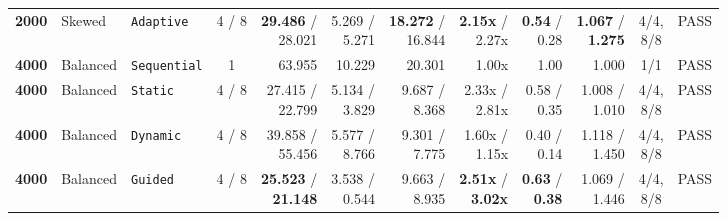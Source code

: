 \documentclass[11pt,a4paper]{article}
\renewcommand{\_}{\textunderscore\allowbreak}
\begin{document}
\begin{table}[H]
{\begin{tabular}{r l l c r r r r r r c c}
\textbf{2000} & Skewed & \texttt{Adaptive} & 4 / 8 & \makecell[r]{\textbf{29.486} /\\ 28.021} & \makecell[r]{5.269 /\\ 5.271} & \makecell[r]{\textbf{18.272} /\\ 16.844} & \makecell[r]{\textbf{2.15x} /\\ 2.27x} & \makecell[r]{\textbf{0.54} /\\ 0.28} & \makecell[r]{\textbf{1.067} /\\ \textbf{1.275}} & \makecell[c]{4/4,\\ 8/8} & PASS \\
\textbf{4000} & Balanced & \texttt{Sequential} & 1 & 63.955 & 10.229 & 20.301 & 1.00x & 1.00 & 1.000 & 1/1 & PASS \\
\textbf{4000} & Balanced & \texttt{Static} & 4 / 8 & \makecell[r]{27.415 /\\ 22.799} & \makecell[r]{5.134 /\\ 3.829} & \makecell[r]{9.687 /\\ 8.368} & \makecell[r]{2.33x /\\ 2.81x} & \makecell[r]{0.58 /\\ 0.35} & \makecell[r]{1.008 /\\ 1.010} & \makecell[c]{4/4,\\ 8/8} & PASS \\
\textbf{4000} & Balanced & \texttt{Dynamic} & 4 / 8 & \makecell[r]{39.858 /\\ 55.456} & \makecell[r]{5.577 /\\ 8.766} & \makecell[r]{9.301 /\\ 7.775} & \makecell[r]{1.60x /\\ 1.15x} & \makecell[r]{0.40 /\\ 0.14} & \makecell[r]{1.118 /\\ 1.450} & \makecell[c]{4/4,\\ 8/8} & PASS \\
\textbf{4000} & Balanced & \texttt{Guided} & 4 / 8 & \makecell[r]{\textbf{25.523} /\\ \textbf{21.148}} & \makecell[r]{3.538 /\\ 0.544} & \makecell[r]{9.663 /\\ 8.935} & \makecell[r]{\textbf{2.51x} /\\ \textbf{3.02x}} & \makecell[r]{\textbf{0.63} /\\ \textbf{0.38}} & \makecell[r]{1.069 /\\ 1.446} & \makecell[c]{4/4,\\ 8/8} & PASS \\

\end{tabular}}
\end{table}
\end{document}
